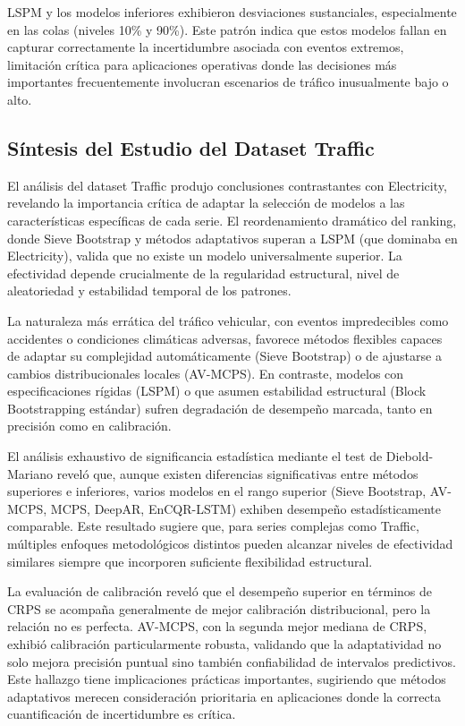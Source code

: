 LSPM y los modelos inferiores exhibieron desviaciones sustanciales, especialmente en las colas (niveles 10\% y 90\%). Este patrón indica que estos modelos fallan en capturar correctamente la incertidumbre asociada con eventos extremos, limitación crítica para aplicaciones operativas donde las decisiones más importantes frecuentemente involucran escenarios de tráfico inusualmente bajo o alto.

\subsection{Síntesis del Estudio del Dataset Traffic}
\label{subsec:traffic_sintesis}

El análisis del dataset Traffic produjo conclusiones contrastantes con Electricity, revelando la importancia crítica de adaptar la selección de modelos a las características específicas de cada serie. El reordenamiento dramático del ranking, donde Sieve Bootstrap y métodos adaptativos superan a LSPM (que dominaba en Electricity), valida que no existe un modelo universalmente superior. La efectividad depende crucialmente de la regularidad estructural, nivel de aleatoriedad y estabilidad temporal de los patrones.

La naturaleza más errática del tráfico vehicular, con eventos impredecibles como accidentes o condiciones climáticas adversas, favorece métodos flexibles capaces de adaptar su complejidad automáticamente (Sieve Bootstrap) o de ajustarse a cambios distribucionales locales (AV-MCPS). En contraste, modelos con especificaciones rígidas (LSPM) o que asumen estabilidad estructural (Block Bootstrapping estándar) sufren degradación de desempeño marcada, tanto en precisión como en calibración.

El análisis exhaustivo de significancia estadística mediante el test de Diebold-Mariano reveló que, aunque existen diferencias significativas entre métodos superiores e inferiores, varios modelos en el rango superior (Sieve Bootstrap, AV-MCPS, MCPS, DeepAR, EnCQR-LSTM) exhiben desempeño estadísticamente comparable. Este resultado sugiere que, para series complejas como Traffic, múltiples enfoques metodológicos distintos pueden alcanzar niveles de efectividad similares siempre que incorporen suficiente flexibilidad estructural.

La evaluación de calibración reveló que el desempeño superior en términos de CRPS se acompaña generalmente de mejor calibración distribucional, pero la relación no es perfecta. AV-MCPS, con la segunda mejor mediana de CRPS, exhibió calibración particularmente robusta, validando que la adaptatividad no solo mejora precisión puntual sino también confiabilidad de intervalos predictivos. Este hallazgo tiene implicaciones prácticas importantes, sugiriendo que métodos adaptativos merecen consideración prioritaria en aplicaciones donde la correcta cuantificación de incertidumbre es crítica.

